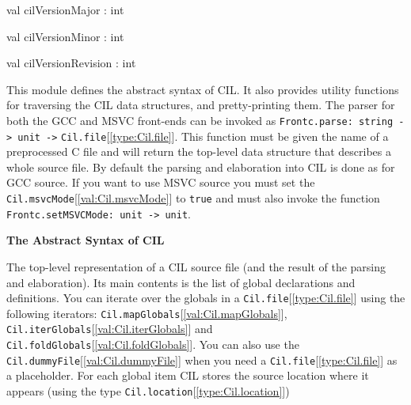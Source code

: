 \documentclass[11pt]{article}
\begin{document}
\label{val:Cil.cilVersionMajor}\begin{ocamldoccode}
val cilVersionMajor : int
\end{ocamldoccode}




\label{val:Cil.cilVersionMinor}\begin{ocamldoccode}
val cilVersionMinor : int
\end{ocamldoccode}




\label{val:Cil.cilVersionRevision}\begin{ocamldoccode}
val cilVersionRevision : int
\end{ocamldoccode}




This module defines the abstract syntax of CIL. It also provides utility 
 functions for traversing the CIL data structures, and pretty-printing 
 them. The parser for both the GCC and MSVC front-ends can be invoked as 
 {\tt{Frontc.parse: string -> unit ->}} {\tt{Cil.file}}[\ref{type:Cil.file}]. This function must be given 
 the name of a preprocessed C file and will return the top-level data 
 structure that describes a whole source file. By default the parsing and 
 elaboration into CIL is done as for GCC source. If you want to use MSVC 
 source you must set the {\tt{Cil.msvcMode}}[\ref{val:Cil.msvcMode}] to {\tt{true}} and must also invoke the 
 function {\tt{Frontc.setMSVCMode: unit -> unit}}.



{\bf The Abstract Syntax of CIL}



The top-level representation of a CIL source file (and the result of the 
 parsing and elaboration). Its main contents is the list of global 
 declarations and definitions. You can iterate over the globals in a 
 {\tt{Cil.file}}[\ref{type:Cil.file}] using the following iterators: {\tt{Cil.mapGlobals}}[\ref{val:Cil.mapGlobals}], 
 {\tt{Cil.iterGlobals}}[\ref{val:Cil.iterGlobals}] and {\tt{Cil.foldGlobals}}[\ref{val:Cil.foldGlobals}]. You can also use the 
 {\tt{Cil.dummyFile}}[\ref{val:Cil.dummyFile}] when you need a {\tt{Cil.file}}[\ref{type:Cil.file}] as a placeholder. For each 
 global item CIL stores the source location where it appears (using the 
 type {\tt{Cil.location}}[\ref{type:Cil.location}])
\end{document}
